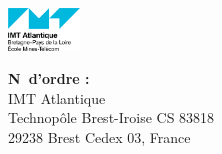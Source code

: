 
\vfill
\begin{minipage}{2.2cm}
    \includegraphics[width=1.9cm]{Figures/imta.png}
\end{minipage}
\begin{minipage}{8cm} \tiny
    \textbf{N\degree~d'ordre :}  \\
    
    IMT Atlantique \\
    Technopôle Brest-Iroise CS 83818 \\
    29238 Brest Cedex 03, France
\end{minipage}

